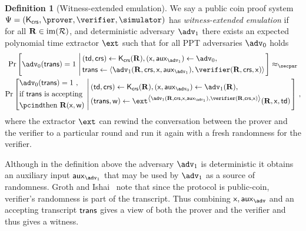 \documentclass[runningheads,11pt]{llncs}
\theoremstyle{definition}
\newtheorem{definition}[theorem]{Definition}
\begin{document}
\begin{definition}[Witness-extended emulation]
	\label{def:wit_ext_em}
	We say a public coin proof system $\proofsystem = (\kcrs, \prover, \verifier,
  \simulator)$ has \emph{witness-extended emulation} if for all $\mathbf{R} \in
  \operatorname{im}(\mathcal{R})$, and deterministic adversary $\adv_1$ there exists an
  expected polynomial time extractor $\ext$ such that for all PPT adversaries $\adv_0$ holds
		\begin{multline*}
		\Pr\left[\adv_0 (\trans) = 1 \,\left|\,
		\begin{aligned}
				& (\td, \crs) \gets \kcrs(\REL), (\inp, \aux_{\adv_1}) \gets \adv_0, \\
				& \trans \gets \ip{\adv_1(\REL, \crs, \inp, \aux_{\adv_1})}{\verifier(\REL, \crs, \inp)}
			\end{aligned}
		\right.
		\right]
		 \approx_\secpar \\
		 \Pr\left[
			\begin{aligned}
				& \adv_0 (\trans) = 1\ , \\
				& \text{if $\trans$ is accepting} \\
				& \pcind \text{then $\REL(\inp, \wit)$}
			\end{aligned}\,\left|\,
			\begin{aligned}
				& (\td, \crs) \gets \kcrs(\REL), (\inp, \aux_{\adv_0}) \gets \adv_1(\REL), \\
				& (\trans, \wit )\gets \ext^{\ip{\adv_1(\REL, \crs, \inp, \aux_{\adv_1})}{\verifier(\REL, \crs, \inp)}}(\REL, \inp, \td)
			\end{aligned}
			\vphantom{\begin{aligned}
				\adv (\trans) = 1, \\
				\text{if $\trans{}$ is accepting} \\
				\pcind \text{then $\REL(\inp, \wit)$}
			\end{aligned}}\right.
			\right]\,,
\end{multline*}
where the extractor $\ext$ can rewind the conversation between the prover and the verifier to a particular round and run it again with a fresh randomness for the verifier.
\end{definition}
Although in the definition above the adversary $\adv_1$ is deterministic it obtains an auxiliary input $\aux_{\adv_1}$ that may be used by $\adv_1$ as a source of randomness. Groth and Ishai~\cite{EC:GroIsh08} note that since the protocol is public-coin, verifier's randomness is part of the transcript. Thus combining $\inp, \aux_\adv$ and an accepting transcript $\mathsf{trans}$ gives a view of both the prover and the verifier and thus gives a witness.
\end{document}
